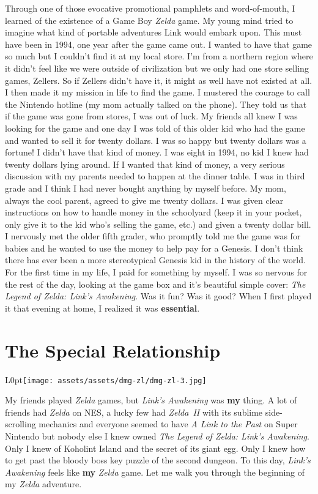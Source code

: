 \documentclass{book}
\begin{document}
Through one of those evocative promotional pamphlets and word-of-mouth, I learned of the existence of a Game Boy \emph{Zelda} game. My young mind tried to imagine what kind of portable adventures Link would embark upon. This must have been in 1994, one year after the game came out. I wanted to have that game so much but I couldn’t find it at my local store. I’m from a northern region where it didn’t feel like we were outside of civilization but we only had one store selling games, Zellers. So if Zellers didn’t have it, it might as well have not existed at all. I then made it my mission in life to find the game. I mustered the courage to call the Nintendo hotline (my mom actually talked on the phone). They told us that if the game was gone from stores, I was out of luck. My friends all knew I was looking for the game and one day I was told of this older kid who had the game and wanted to sell it for twenty dollars. I was so happy but twenty dollars was a fortune! I didn’t have that kind of money. I was eight in 1994, no kid I knew had twenty dollars lying around. If I wanted that kind of money, a very serious discussion with my parents needed to happen at the dinner table. I was in third grade and I think I had never bought anything by myself before. My mom, always the cool parent, agreed to give me twenty dollars. I was given clear instructions on how to handle money in the schoolyard (keep it in your pocket, only give it to the kid who’s selling the game, etc.) and given a twenty dollar bill. I nervously met the older fifth grader, who promptly told me the game was for babies and he wanted to use the money to help pay for a Genesis. I don’t think there has ever been a more stereotypical Genesis kid in the history of the world. For the first time in my life, I paid for something by myself. I was so nervous for the rest of the day, looking at the game box and it’s beautiful simple cover: \emph{The Legend of Zelda: Link’s Awakening}. Was it fun? Was it good? When I first played it that evening at home, I realized it was \textbf{essential}.\par
\FloatBarrier\section*{The Special Relationship}
\begin{wrapfigure}{L}{0pt}{\texttt{[image: assets/assets/dmg-zl/dmg-zl-3.jpg]}}\end{wrapfigure}\noindent
My friends played \emph{Zelda} games, but \emph{Link’s Awakening} was \textbf{my} thing. A lot of friends had \emph{Zelda} on NES, a lucky few had \emph{Zelda~II} with its sublime side-scrolling mechanics and everyone seemed to have \emph{A Link to the Past} on Super Nintendo but nobody else I knew owned \emph{The Legend of Zelda: Link’s Awakening}. Only I knew of Koholint Island and the secret of its giant egg. Only I knew how to get past the bloody boss key puzzle of the second dungeon. To this day, \emph{Link’s Awakening} feels like \textbf{my} \emph{Zelda} game. Let me walk you through the beginning of my \emph{Zelda} adventure.\par
\end{document}
